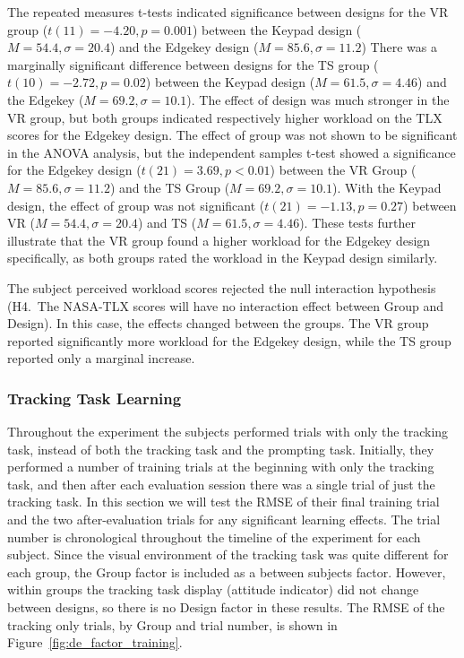 The repeated measures t-tests indicated significance between designs for the VR group ($t(11) = -4.20, p = 0.001$) between the Keypad design ($M = 54.4, \sigma = 20.4$) and the Edgekey design ($M = 85.6, \sigma = 11.2$)
There was a marginally significant difference between designs for the TS group ($t(10) = -2.72, p = 0.02$) between the Keypad design ($M = 61.5, \sigma = 4.46$) and the Edgekey ($M = 69.2, \sigma = 10.1$).
The effect of design was much stronger in the VR group, but both groups indicated respectively higher workload on the TLX scores for the Edgekey design.
The effect of group was not shown to be significant in the ANOVA analysis, but the independent samples t-test showed a significance for the Edgekey design ($t(21) = 3.69, p < 0.01$) between the VR Group ($M = 85.6, \sigma = 11.2$) and the TS Group ($M = 69.2, \sigma = 10.1$).
With the Keypad design, the effect of group was not significant ($t(21) = -1.13, p=0.27$) between VR ($M = 54.4, \sigma = 20.4$) and TS ($M = 61.5, \sigma = 4.46$).
These tests further illustrate that the VR group found a higher workload for the Edgekey design specifically, as both groups rated the workload in the Keypad design similarly.

The subject perceived workload scores rejected the null interaction hypothesis (H4.~The NASA-TLX scores will have no interaction effect between Group and Design).
In this case, the effects changed between the groups.
The VR group reported significantly more workload for the Edgekey design, while the TS group reported only a marginal increase.

\subsubsection{Tracking Task Learning}

Throughout the experiment the subjects performed trials with only the tracking task, instead of both the tracking task and the prompting task.
Initially, they performed a number of training trials at the beginning with only the tracking task, and then after each evaluation session there was a single trial of just the tracking task.
In this section we will test the RMSE of their final training trial and the two after-evaluation trials for any significant learning effects.
The trial number is chronological throughout the timeline of the experiment for each subject.
Since the visual environment of the tracking task was quite different for each group, the Group factor is included as a between subjects factor.
However, within groups the tracking task display (attitude indicator) did not change between designs, so there is no Design factor in these results.
The RMSE of the tracking only trials, by Group and trial number, is shown in Figure~\ref{fig:de_factor_training}.

